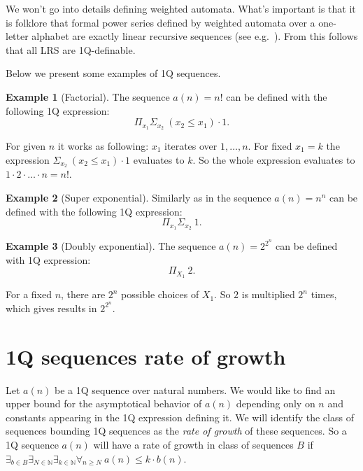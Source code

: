 \documentclass[12pt]{article}
\theoremstyle{definition}
\newtheorem{example}{Example}[section]
\begin{document}
We won't go into details defining weighted automata. What's important is that it is folklore that formal power series defined by weighted automata over a one-letter alphabet are exactly linear recursive sequences (see e.g.~\cite{BarloyFLM22}). From this follows that all LRS are 1Q-definable.

Below we present some examples of 1Q sequences.

\begin{example}[Factorial]
\label{ExSeqFactorial}
    The sequence $a(n) = n!$ can be defined with the following 1Q expression: 
    $$\Pi_{x_1}\Sigma_{x_2} \ (x_2 \leq x_1) \cdot 1.$$

    For given $n$ it works as following: $x_1$ iterates over $1,\ldots,n$. For fixed $x_1 = k$ the expression $\Sigma_{x_2} \ (x_2 \leq x_1) \cdot 1$ evaluates to $k$. So the whole expression evaluates to $1 \cdot 2 \cdot \ldots \cdot n = n!$.
\end{example}

\begin{example}[Super exponential]
\label{ExSeqNToN}
    Similarly as in  the sequence $a(n) = n^n$ can be defined with the following 1Q expression:
    $$\Pi_{x_1}\Sigma_{x_2} \ 1.$$
\end{example}

\begin{example}[Doubly exponential]
\label{ExSeqDoubleExponential}
    The sequence $a(n) = 2^{2^n}$ can be defined with 1Q expression:
    $$\Pi_{X_1} \ 2.$$

    For a fixed $n$, there are $2^n$ possible choices of $X_1$. So $2$ is multiplied $2^n$ times, which gives results in $2^{2^n}$.
\end{example}

\section{1Q sequences rate of growth}
\label{Sec1QRateOfGrowth}
Let $a(n)$ be a 1Q sequence over natural numbers. We would like to find an upper bound for the asymptotical behavior of $a(n)$ depending only on $n$ and constants appearing in the 1Q expression defining it. We will identify the class of sequences bounding 1Q sequences as the \emph{rate of growth} of these sequences. So a 1Q sequence $a(n)$ will have a rate of growth in class of sequences $B$ if $\exists_{b \in B} \exists_{N \in \mathbb{N}} \exists_{k \in \mathbb{N}} \forall_{n \geq N} \ a(n) \leq k \cdot b(n)$.
\end{document}
